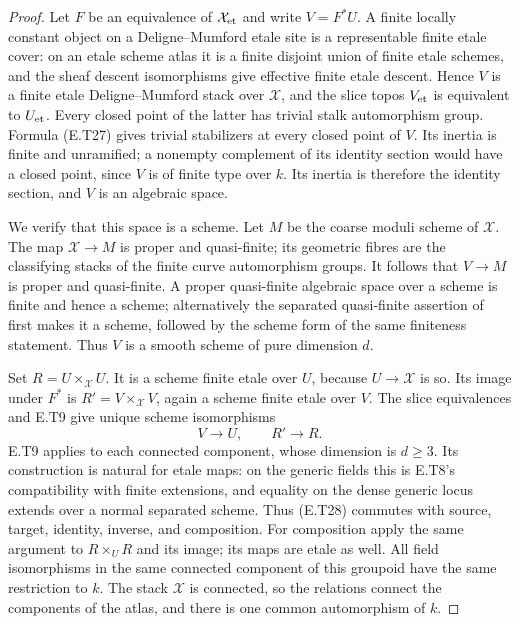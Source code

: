 \begin{proof}
Let $F$ be an equivalence of $\mathcal X_{\rm et}$ and
write $V=F^*U$.  A finite locally constant object on a
Deligne--Mumford etale site is a representable finite etale
cover: on an etale scheme atlas it is a finite disjoint
union of finite etale schemes, and the sheaf descent
isomorphisms give effective finite etale descent.  Hence
$V$ is a finite etale Deligne--Mumford stack over
$\mathcal X$, and the slice topos $V_{\rm et}$ is
equivalent to $U_{\rm et}$.  Every closed point of the
latter has trivial stalk automorphism group.  Formula
(E.T27) gives trivial stabilizers at every closed point
of $V$.  Its inertia is finite and unramified; a nonempty
complement of its identity section would have a closed
point, since $V$ is of finite type over $k$.  Its inertia
is therefore the identity section, and $V$ is an
algebraic space.

We verify that this space is a scheme.  Let $M$ be the
coarse moduli scheme of $\mathcal X$.  The map
$\mathcal X\to M$ is proper and quasi-finite; its
geometric fibres are the classifying stacks of the
finite curve automorphism groups.  It follows that
$V\to M$ is proper and quasi-finite.  A proper
quasi-finite algebraic space over a scheme is finite
and hence a scheme; alternatively the separated
quasi-finite assertion of
\cite[Proposition 67.50.2]{StacksSeparatedQuasiFinite}
first makes it a scheme, followed by the scheme form
of the same finiteness statement.  Thus $V$ is a smooth
scheme of pure dimension $d$.

Set $R=U\times_{\mathcal X}U$.  It is a scheme finite
etale over $U$, because $U\to\mathcal X$ is so.  Its
image under $F^*$ is
$R'=V\times_{\mathcal X}V$, again a scheme finite
etale over $V$.  The slice equivalences and E.T9 give
unique scheme isomorphisms
\[
                    V\longrightarrow U,
          \qquad R'\longrightarrow R.                       \tag{E.T28}
\]
E.T9 applies to each connected component, whose dimension
is $d\geq3$.  Its construction is natural for etale maps:
on the generic fields this is E.T8's compatibility with
finite extensions, and equality on the dense generic
locus extends over a normal separated scheme.  Thus
(E.T28) commutes with source, target, identity, inverse,
and composition.  For composition apply the same
argument to $R\times_U R$ and its image; its maps are
etale as well.  All field isomorphisms in the same
connected component of this groupoid have the same
restriction to $k$.  The stack $\mathcal X$ is connected,
so the relations connect the components of the atlas,
and there is one common automorphism of $k$.


\end{proof}
